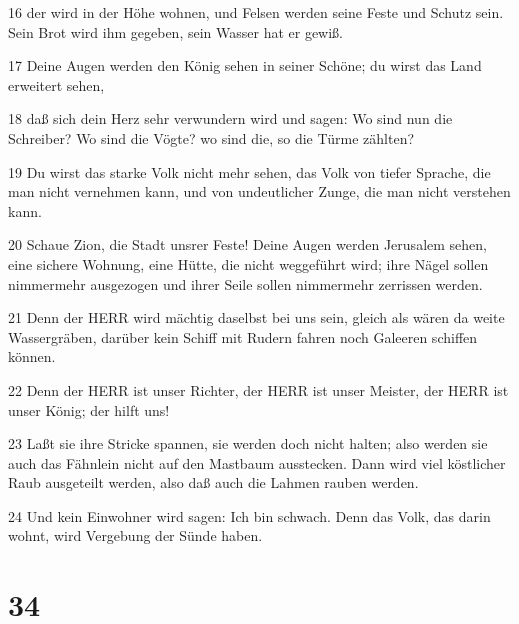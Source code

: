 \par 16 der wird in der Höhe wohnen, und Felsen werden seine Feste und Schutz sein. Sein Brot wird ihm gegeben, sein Wasser hat er gewiß.
\par 17 Deine Augen werden den König sehen in seiner Schöne; du wirst das Land erweitert sehen,
\par 18 daß sich dein Herz sehr verwundern wird und sagen: Wo sind nun die Schreiber? Wo sind die Vögte? wo sind die, so die Türme zählten?
\par 19 Du wirst das starke Volk nicht mehr sehen, das Volk von tiefer Sprache, die man nicht vernehmen kann, und von undeutlicher Zunge, die man nicht verstehen kann.
\par 20 Schaue Zion, die Stadt unsrer Feste! Deine Augen werden Jerusalem sehen, eine sichere Wohnung, eine Hütte, die nicht weggeführt wird; ihre Nägel sollen nimmermehr ausgezogen und ihrer Seile sollen nimmermehr zerrissen werden.
\par 21 Denn der HERR wird mächtig daselbst bei uns sein, gleich als wären da weite Wassergräben, darüber kein Schiff mit Rudern fahren noch Galeeren schiffen können.
\par 22 Denn der HERR ist unser Richter, der HERR ist unser Meister, der HERR ist unser König; der hilft uns!
\par 23 Laßt sie ihre Stricke spannen, sie werden doch nicht halten; also werden sie auch das Fähnlein nicht auf den Mastbaum ausstecken. Dann wird viel köstlicher Raub ausgeteilt werden, also daß auch die Lahmen rauben werden.
\par 24 Und kein Einwohner wird sagen: Ich bin schwach. Denn das Volk, das darin wohnt, wird Vergebung der Sünde haben.

\chapter{34}

